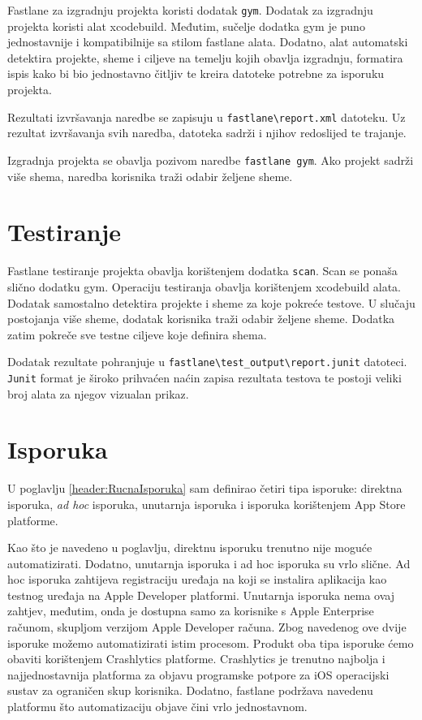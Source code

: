 \documentclass[times, utf8, diplomski, numeric]{fer}
\begin{document}
\begin{appendices}
Fastlane za izgradnju projekta koristi dodatak \verb|gym|\citep{fastlane:gym}. Dodatak za izgradnju projekta koristi alat xcodebuild. Međutim, sučelje dodatka gym je puno jednostavnije i kompatibilnije sa stilom fastlane alata. Dodatno, alat automatski detektira projekte, sheme i ciljeve na temelju kojih obavlja izgradnju, formatira ispis kako bi bio jednostavno čitljiv te kreira datoteke potrebne za isporuku projekta.

Rezultati izvršavanja naredbe se zapisuju u \verb|fastlane\report.xml| datoteku. Uz rezultat izvršavanja svih naredba, datoteka sadrži i njihov redoslijed te trajanje.

Izgradnja projekta se obavlja pozivom naredbe \verb|fastlane gym|. Ako projekt sadrži više shema, naredba korisnika traži odabir željene sheme.

\section{Testiranje}

Fastlane testiranje projekta obavlja korištenjem dodatka \verb|scan|\citep{fastlane:scan}. Scan se ponaša slično dodatku gym. Operaciju testiranja obavlja korištenjem xcodebuild alata. Dodatak samostalno detektira projekte i sheme za koje pokreće testove. U slučaju postojanja više sheme, dodatak korisnika traži odabir željene sheme. Dodatka zatim pokreče sve testne ciljeve koje definira shema.

Dodatak rezultate pohranjuje u \verb|fastlane\test_output\report.junit| datoteci. \verb|Junit| format je široko prihvaćen naćin zapisa rezultata testova te postoji veliki broj alata za njegov vizualan prikaz.

\section{Isporuka}

U poglavlju \ref{header:RucnaIsporuka} sam definirao četiri tipa isporuke: direktna isporuka, \textit{ad hoc} isporuka, unutarnja isporuka i isporuka korištenjem App Store platforme.

Kao što je navedeno u poglavlju, direktnu isporuku trenutno nije moguće automatizirati. Dodatno, unutarnja isporuka i ad hoc isporuka su vrlo slične. Ad hoc isporuka zahtijeva registraciju uređaja na koji se instalira aplikacija kao testnog uređaja na Apple Developer platformi. Unutarnja isporuka nema ovaj zahtjev, međutim, onda je dostupna samo za korisnike s Apple Enterprise računom, skupljom verzijom Apple Developer računa. Zbog navedenog ove dvije isporuke možemo automatizirati istim procesom. Produkt oba tipa isporuke ćemo obaviti korištenjem Crashlytics platforme. Crashlytics je trenutno najbolja i najjednostavnija platforma za objavu programske potpore za iOS operacijski sustav za ograničen skup korisnika. Dodatno, fastlane podržava navedenu platformu što automatizaciju objave čini vrlo jednostavnom.


\end{appendices}
\end{document}
